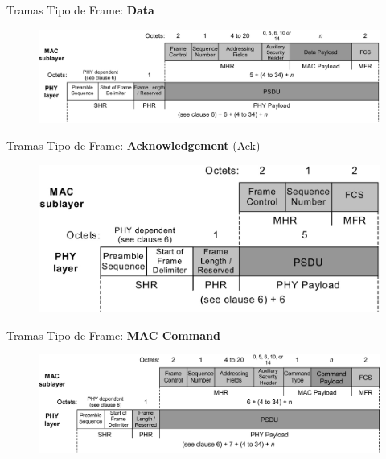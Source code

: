 \documentclass[aspectratio=169]{beamer}
\begin{document}
\begin{frame}[t]{Tramas}
Tipo de Frame: \textbf{Data}
\vspace{10px}
	\begin{figure}[H]
		\includegraphics[width=1\textwidth]{./imagenes/data.jpg}
	\end{figure}	  	  	
\end{frame}


\begin{frame}[t]{Tramas}
Tipo de Frame: \textbf{Acknowledgement} (Ack)
\vspace{10px}
	\begin{figure}[H]
	\centering
		\includegraphics[width=.8\textwidth]{./imagenes/ack.jpg}
	\end{figure}	  	  	
\end{frame}

\begin{frame}[t]{Tramas}
Tipo de Frame: \textbf{MAC Command}
\vspace{10px}
	\begin{figure}[H]
		\includegraphics[width=1\textwidth]{./imagenes/maccommand.jpg}
	\end{figure}	  	  	
\end{frame}
\end{document}
